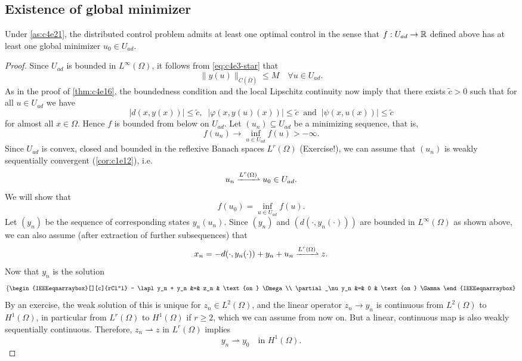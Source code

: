 \documentclass[../skript.tex]{subfiles}
\begin{document}
\subsection{Existence of global minimizer}
\begin{theorem} %
\label{thm:c4e22}
Under \cref{as:c4e21}, the distributed control problem admits at least one optimal control in the sense that $f : U_{ad} \to \mathbb{R}$ defined above has at least one global minimizer $u_0 \in U_{ad}$.
\end{theorem}
\begin{proof}
Since $U_{ad}$ is bounded in $L^\infty(\Omega)$, it follows from \cref{eq:c4e3-star} that
\[
	\| y(u) \|_{C(\bar{\Omega})} \leq M \quad \forall u \in U_{ad}.
\]
As in the proof of \cref{thm:c4e16}, the boundedness condition and the local Lipschitz continuity now imply that there exists $\tilde{c} > 0$ such that for all $u \in U_{ad}$ we have
\[
	|d(x, y(x))| \leq \tilde{c}, \;\; |\varphi(x, y(u)(x))| \leq \tilde{c} \;\; \text{and} \;\; |\psi(x, u(x))| \leq \tilde{c}
\]
for almost all $x \in \Omega$.
Hence $f$ is bounded from below on $U_{ad}$. Let $(u_n) \subseteq U_{ad}$ be a minimizing sequence, that is,
\[
	f(u_n) \to \inf_{u \in U_{ad}} f(u) > - \infty.
\]
Since $U_{ad}$ is convex, closed and bounded in the reflexive Banach spaces $L^r(\Omega)$ (Exercise!), we can assume that $(u_n)$ is weakly sequentially convergent (\cref{cor:c1e12}), i.e.
\[
	u_n \xrightharpoonup{L^r(\Omega)} u_0 \in U_{ad}.
\]
We will show that
\[
	f(u_0) = \inf_{u \in U_{ad}} f(u).
\]
Let $(y_n)$ be the sequence of corresponding states $y_n(u_n)$.
Since $(y_n)$ and $(d(\cdot, y_n(\cdot)))$ are bounded in $L^\infty(\Omega)$ as shown above, we can also assume (after extraction of further subsequences) that
\[
	x_n = - d(\cdot, y_n(\cdot)) + y_n + u_n \xrightharpoonup{L^r(\Omega)} z.
\]
Now that $y_n$ is the solution
\[
	\left\{ \begin{IEEEeqnarraybox}[][c]{rCl"l}
	- \lapl y_n + y_n &=& z_n & \text{on } \Omega \\
	\partial_\nu y_n &=& 0 & \text{on } \Gamma 
	\end{IEEEeqnarraybox} \right.
\]
By an exercise, the weak solution of this is unique for $z_n \in L^2(\Omega)$, and the linear operator $z_n \to y_n$ is continuous from $L^2(\Omega)$ to $H^1(\Omega)$, in particular from $L^r(\Omega)$ to $H^1(\Omega)$ if $r \geq 2$, which we can assume from now on. But a linear, continuous map is also weakly sequentially continuous.
Therefore, $z_n \rightharpoonup z$ in $L^r(\Omega)$ implies
\[
	y_n \rightharpoonup y_0 \quad \text{in } H^1(\Omega).
\]
\end{proof}
\end{document}
